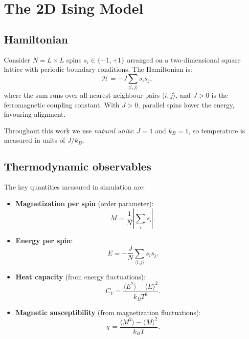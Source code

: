 \documentclass[11pt,a4paper]{article}
\begin{document}
\section{The 2D Ising Model}
\label{sec:model}

\subsection{Hamiltonian}

Consider $N = L \times L$ spins $s_i \in \{-1, +1\}$ arranged on a
two-dimensional square lattice with periodic boundary conditions. The
Hamiltonian is:
\begin{equation}
  \mathcal{H} = -J\sum_{\langle i,j\rangle} s_i s_j,
  \label{eq:hamiltonian}
\end{equation}
where the sum runs over all nearest-neighbour pairs $\langle i,j\rangle$,
and $J > 0$ is the ferromagnetic coupling constant. With $J > 0$, parallel
spins lower the energy, favouring alignment.

Throughout this work we use \emph{natural units}: $J = 1$ and $k_B = 1$,
so temperature is measured in units of $J/k_B$.

\subsection{Thermodynamic observables}

The key quantities measured in simulation are:

\begin{itemize}[leftmargin=1.5em]
  \item \textbf{Magnetization per spin} (order parameter):
  \begin{equation}
    M = \frac{1}{N}\left|\sum_i s_i\right|.
    \label{eq:mag}
  \end{equation}
  \item \textbf{Energy per spin}:
  \begin{equation}
    E = -\frac{J}{N}\sum_{\langle i,j\rangle} s_i s_j.
    \label{eq:energy}
  \end{equation}
  \item \textbf{Heat capacity} (from energy fluctuations):
  \begin{equation}
    C_V = \frac{\langle E^2\rangle - \langle E\rangle^2}{k_B T^2}.
    \label{eq:cv}
  \end{equation}
  \item \textbf{Magnetic susceptibility} (from magnetization fluctuations):
  \begin{equation}
    \chi = \frac{\langle M^2\rangle - \langle M\rangle^2}{k_B T}.
    \label{eq:chi}
  \end{equation}
\end{itemize}
\end{document}
